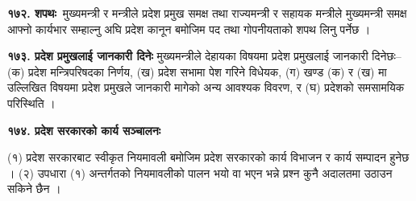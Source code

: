 \textbf{१७२. शपथः }मुख्यमन्त्री र मन्त्रीले प्रदेश प्रमुख समक्ष तथा राज्यमन्त्री र सहायक मन्त्रीले मुख्यमन्त्री समक्ष आफ्नो कार्यभार सम्हाल्नु अघि प्रदेश कानून बमोजिम पद तथा गोपनीयताको शपथ लिनु पर्नेछ ।

\textbf{१७३. प्रदेश प्रमुखलाई जानकारी दिनेः} मुख्यमन्त्रीले देहायका विषयमा प्रदेश प्रमुखलाई जानकारी दिनेछः–
(क) प्रदेश मन्त्रिपरिषदका निर्णय,
(ख) प्रदेश सभामा पेश गरिने विधेयक,
(ग) खण्ड (क) र (ख) मा उल्लिखित विषयमा प्रदेश प्रमुखले जानकारी मागेको अन्य आवश्यक विवरण, र
(घ) प्रदेशको समसामयिक परिस्थिति ।

\textbf{१७४. प्रदेश सरकारको कार्य सञ्चालनः}

(१) प्रदेश सरकारबाट स्वीकृत नियमावली बमोजिम प्रदेश सरकारको कार्य विभाजन र कार्य सम्पादन हुनेछ ।
(२) उपधारा (१) अन्तर्गतको नियमावलीको पालन भयो वा भएन भन्ने प्रश्न कुनै अदालतमा उठाउन सकिने छैन ।